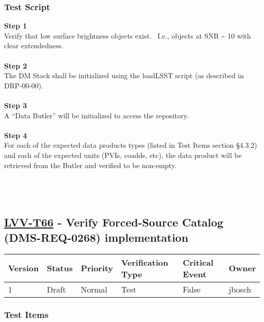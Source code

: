 \hypertarget{test-script-5}{%
\subsubsection{Test Script}\label{test-script-5}}

\textbf{Step 1}\\
Verify that low surface brightness objects exist. ~I.e., objects at SNR
\textasciitilde{} 10 with clear extendedness.\\
~\\
\textbf{Step 2}\\
The DM Stack shall be initialized using the loadLSST script (as
described in DRP-00-00).\\
~\\
\textbf{Step 3}\\
A ``Data Butler'' will be initialized to access the repository.\\
~\\
\textbf{Step 4}\\
For each of the expected data products types (listed in Test Items
section §4.3.2) and each of the expected units (PVIs, coadds, etc), the
data product will be retrieved from the Butler and verified to be
non-empty.\\
~\\
~\\
~\\

\hypertarget{lvv-t66---verify-forced-source-catalog-dms-req-0268-implementation}{%
\subsection{\texorpdfstring{\href{https://jira.lsstcorp.org/secure/Tests.jspa\#/testCase/LVV-T66}{LVV-T66}
- Verify Forced-Source Catalog (DMS-REQ-0268)
implementation}{LVV-T66 - Verify Forced-Source Catalog (DMS-REQ-0268) implementation}}\label{lvv-t66---verify-forced-source-catalog-dms-req-0268-implementation}}

\begin{longtable}[]{@{}llllll@{}}
\toprule
Version & Status & Priority & Verification Type & Critical Event &
Owner\tabularnewline
\midrule
\endhead
1 & Draft & Normal & Test & False & jbosch\tabularnewline
\bottomrule
\end{longtable}

\hypertarget{test-items-6}{%
\subsubsection{Test Items}\label{test-items-6}}


